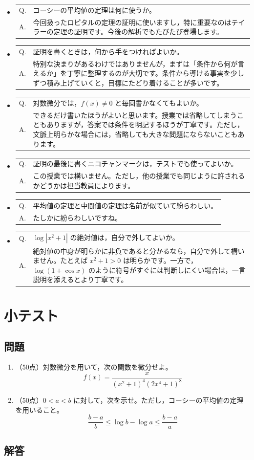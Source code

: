 \documentclass[a4paper,12pt]{jsarticle}
\makeatletter
\newcommand{\feedbackqa}[2]{%
\item[]
\begin{tabular}[t]{@{}p{1.8em}@{\hspace{0.4em}}p{\dimexpr\linewidth-2.2em\relax}@{}}
Q. & #1 \\
A. & #2
\end{tabular}
\par\smallskip\hrulefill
}
\theoremstyle{definition}
\makeatother
\begin{document}
\begin{itemize}[leftmargin=1.5em,itemsep=0.7em,topsep=0.3em]
\feedbackqa{コーシーの平均値の定理は何に使うか。}{今回扱ったロピタルの定理の証明に使いますし，特に重要なのはテイラーの定理の証明です。今後の解析でもたびたび登場します。}

\feedbackqa{証明を書くときは，何から手をつければよいか。}{特別な決まりがあるわけではありませんが，まずは「条件から何が言えるか」を丁寧に整理するのが大切です。条件から導ける事実を少しずつ積み上げていくと，目標にたどり着けることが多いです。}

\feedbackqa{対数微分では，$f(x)\neq 0$ と毎回書かなくてもよいか。}{できるだけ書いたほうがよいと思います。授業では省略してしまうこともありますが，答案では条件を明記するほうが丁寧です。ただし，文脈上明らかな場合には，省略しても大きな問題にならないこともあります。}

\feedbackqa{証明の最後に書くニコチャンマークは，テストでも使ってよいか。}{この授業では構いません。ただし，他の授業でも同じように許されるかどうかは担当教員によります。}

\feedbackqa{平均値の定理と中間値の定理は名前が似ていて紛らわしい。}{たしかに紛らわしいですね。}

\feedbackqa{$\log|x^2+1|$ の絶対値は，自分で外してよいか。}{絶対値の中身が明らかに非負であると分かるなら，自分で外して構いません。たとえば $x^2+1>0$ は明らかです。一方で，$\log(1+\cos x)$ のように符号がすぐには判断しにくい場合は，一言説明を添えるとより丁寧です。}
 
\end{itemize}
\section*{小テスト}

\subsection*{問題}

\begin{enumerate}
\item （50点）対数微分を用いて，次の関数を微分せよ。
\[
f(x)=\frac{x}{(x^2+1)^4(2x^4+1)^8}
\]

\item （50点）$0<a<b$ に対して，次を示せ。ただし，コーシーの平均値の定理を用いること。
\[
\frac{b-a}{b}\leq \log b-\log a\leq \frac{b-a}{a}
\]
\end{enumerate}

\subsection*{解答}
\end{document}
